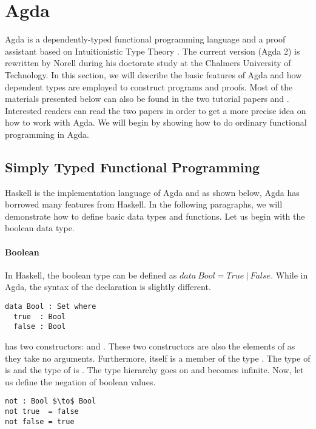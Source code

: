 \section{Agda}
\par Agda is a dependently-typed functional programming language and a
proof assistant based on Intuitionistic Type Theory
\cite{martin1984}. The current version (Agda 2) is rewritten by Norell
\cite{norell2007} during his doctorate study at the Chalmers University of
Technology. In this section, we will describe the basic features of
Agda and how dependent types are employed to construct programs and
proofs. Most of the materials presented below can also be
found in the two tutorial papers \cite{bove2009} and
\cite{norell2008}. Interested readers can read the two papers in order to get
a more precise idea on how to work with Agda. We will begin by
showing how to do ordinary functional programming in Agda. 


\subsection{Simply Typed Functional Programming}
\par Haskell is the implementation language
of Agda and as shown below, Agda has borrowed many features from
Haskell. In the following paragraphs, we will demonstrate how to
define basic data types and functions. Let us begin with the boolean
data type. 

\paragraph{Boolean} In Haskell, the boolean type can be defined as
\(data\ Bool = True\ |\ False\). While in Agda, the syntax of the
declaration is slightly different. 
\begin{lstlisting}[mathescape=true,xleftmargin=.3\textwidth]
data Bool : Set where
  true  : Bool
  false : Bool
\end{lstlisting}

\par {} has two constructors:  and . These two constructors
are also the elements of  as they take no arguments. Furthermore,  itself is a member of the type
. The type of  is  and the type of  is
. The type hierarchy goes on and becomes infinite. Now, let us define the negation of boolean values. 
\begin{lstlisting}[mathescape=true,xleftmargin=.3\textwidth]
not : Bool $\to$ Bool
not true  = false
not false = true
\end{lstlisting}

